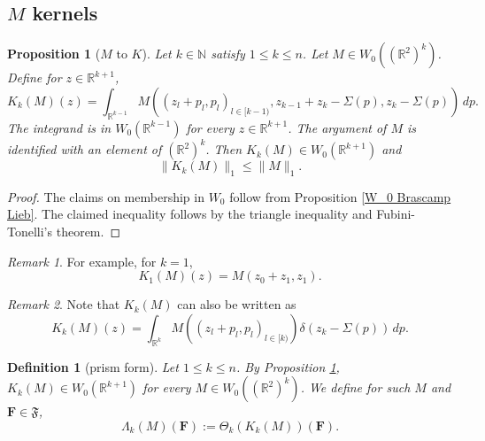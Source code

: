 \documentclass[12pt,reqno]{amsart}
\theoremstyle{plain}
\newtheorem{proposition}[theorem]{Proposition}
\newtheorem{definition}[theorem]{Definition}
\numberwithin{equation}{section}
\theoremstyle{remark}
\newtheorem{rem}{Remark}[section]
\newcommand{\uses}[1]{}
\newcommand{\usesdefs}[1]{}
\newcommand{\R}{{\mathbb R}}
\newcommand{\N}{{\mathbb N}}
\begin{document}
\subsection{\texorpdfstring{$M$}{M} kernels}

\begin{proposition}[$M$ to $K$]\label{M to K}\uses{W_0 Brascamp Lieb}\usesdefs{auto:Wiener-space-definition}
Let $k\in\N$ satisfy $1\le k\le n$. Let $M\in W_0((\R^2)^k)$.
Define for $z\in \R^{k+1}$,
\begin{equation}\label{kviam_2}
    K_k(M)(z)=\int_{\R^{k-1}}  M((z_{l}+p_{l},p_{l})_{l\in [k-1)}, z_{k-1}+z_{k}-\Sigma(p),z_{k}-\Sigma(p))\,dp.
\end{equation}
The integrand is in $W_0(\R^{k-1})$ for every $z\in\R^{k+1}$.
The argument of $M$ is identified with an element of $(\R^2)^{k}$.
Then $K_k(M)\in W_0(\R^{k+1})$ and
\begin{equation}\label{auto:K-map-L1-bound} \|K_k(M)\|_1 \le \|M\|_1. \end{equation}
\end{proposition}

\begin{proof}
The claims on membership in $W_0$ follow from
Proposition \ref{W_0 Brascamp Lieb}.
The claimed inequality follows by the triangle inequality and Fubini-Tonelli's theorem.
\end{proof}

\begin{rem}
For example, for $k=1$,
\begin{equation}\label{auto:K-one-explicit-formula}K_1(M)(z)=M(z_0+z_1,z_1).\end{equation}
\end{rem}

\begin{rem}
Note that $K_k(M)$ can also be written as
\begin{equation}\label{kviam_2'}
    K_k(M)(z)=\int_{\R^{k}}  M((z_{l}+p_{l},p_{l})_{l\in[k)}) \delta( z_{k}-\Sigma(p))\,dp.
\end{equation}
\end{rem}

\begin{definition}[prism form]\label{auto:prism-form-definition}\uses{M to K}\usesdefs{auto:Wiener-space-definition,normalized function tuples,prism Brascamp--Lieb}
Let $1\le k\le n$. By Proposition \ref{M to K}, $K_k(M)\in W_0(\R^{k+1})$ for every $M\in W_0((\R^2)^k)$. We define for such $M$ and $\mathbf{F}\in\mathfrak{F}$,
\begin{equation}\label{auto:prism-form-formula}\Lambda_k(M)(\mathbf{F}) := \Theta_k(K_k(M))(\mathbf{F}).\end{equation}
\end{definition}
\end{document}
